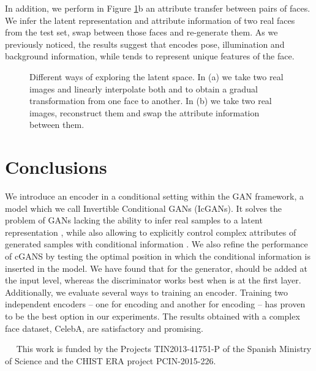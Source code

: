 \documentclass{article}
\newcommand{\minisection}[1]{\vspace{0.04in} \noindent {\bf #1}\ \ }
\begin{document}
In addition, we perform in Figure \ref{fig:icgan_manipulate_Z}b an attribute transfer between pairs of faces. We infer the latent representation  and attribute information  of two real faces from the test set, swap  between those faces and re-generate them. As we previously noticed, the results suggest that  encodes pose, illumination and background information, while  tends to represent unique features of the face.

\begin{figure}[t]
        \centering
        \caption{Different ways of exploring the latent space. In (a) we take two real images and linearly interpolate both  and  to obtain a gradual transformation from one face to another. In (b) we take two real images, reconstruct them and swap the attribute information  between them.} \label{fig:icgan_manipulate_Z}
\end{figure} 
\section{Conclusions} \label{sec:conclusions}


We introduce an encoder in a conditional setting within the GAN framework, a model which we call Invertible Conditional GANs (IcGANs). It solves the problem of GANs lacking the ability to infer real samples to a latent representation , while also allowing to explicitly control complex attributes of generated samples with conditional information . We also refine the performance of cGANS by testing the optimal position in which the conditional information  is inserted in the model. We have found that for the generator,  should be added at the input level, whereas the discriminator works best when  is at the first layer. Additionally, we evaluate several ways to training an encoder. Training two independent encoders -- one for encoding  and another for encoding  -- has proven to be the best option in our experiments. The results obtained with a complex face dataset, CelebA, are satisfactory and promising.

%
 
\minisection{Acknowledgments}
This work is funded by the Projects TIN2013-41751-P of the Spanish Ministry of Science and the CHIST ERA project PCIN-2015-226.

\newpage

{\small
}
\end{document}
